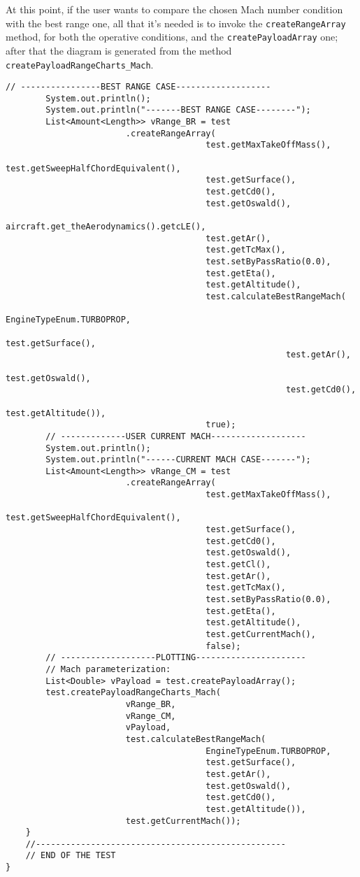 \bigskip
At this point, if the user wants to compare the chosen Mach number condition with the best range one, all that it’s needed is to invoke the \lstinline[language=Java]!createRangeArray! method, for both the operative conditions, and the \lstinline[language=Java]!createPayloadArray! one; after that the diagram is generated from the method \lstinline[language=Java]!createPayloadRangeCharts_Mach!.

\bigskip
\begin{lstlisting}[caption={Excerpt of the ATR-72 Payload-Range test - Payload-Range diagram evaluation and plot}, captionpos=b, tabsize=2]
		// ----------------BEST RANGE CASE-------------------
		System.out.println();
		System.out.println("-------BEST RANGE CASE--------");
		List<Amount<Length>> vRange_BR = test
						.createRangeArray(
										test.getMaxTakeOffMass(),
										test.getSweepHalfChordEquivalent(),
										test.getSurface(),
										test.getCd0(),
										test.getOswald(),
										aircraft.get_theAerodynamics().getcLE(),
										test.getAr(),
										test.getTcMax(),
										test.setByPassRatio(0.0),
										test.getEta(),
										test.getAltitude(),
										test.calculateBestRangeMach(
														EngineTypeEnum.TURBOPROP,
														test.getSurface(),
														test.getAr(),
														test.getOswald(),
														test.getCd0(),
														test.getAltitude()),
										true);		
		// -------------USER CURRENT MACH-------------------
		System.out.println();
		System.out.println("------CURRENT MACH CASE-------");
		List<Amount<Length>> vRange_CM = test
						.createRangeArray(
										test.getMaxTakeOffMass(),
										test.getSweepHalfChordEquivalent(),
										test.getSurface(),
										test.getCd0(),
										test.getOswald(),
										test.getCl(),
										test.getAr(),
										test.getTcMax(),
										test.setByPassRatio(0.0),
										test.getEta(),
										test.getAltitude(),
										test.getCurrentMach(),
										false);
		// -------------------PLOTTING----------------------	
		// Mach parameterization:
		List<Double> vPayload = test.createPayloadArray();
		test.createPayloadRangeCharts_Mach(
						vRange_BR,
						vRange_CM,
						vPayload,
						test.calculateBestRangeMach(
										EngineTypeEnum.TURBOPROP,
										test.getSurface(),
										test.getAr(),
										test.getOswald(),
										test.getCd0(),
										test.getAltitude()),
						test.getCurrentMach());
	}
	//--------------------------------------------------
	// END OF THE TEST
} 
\end{lstlisting}


